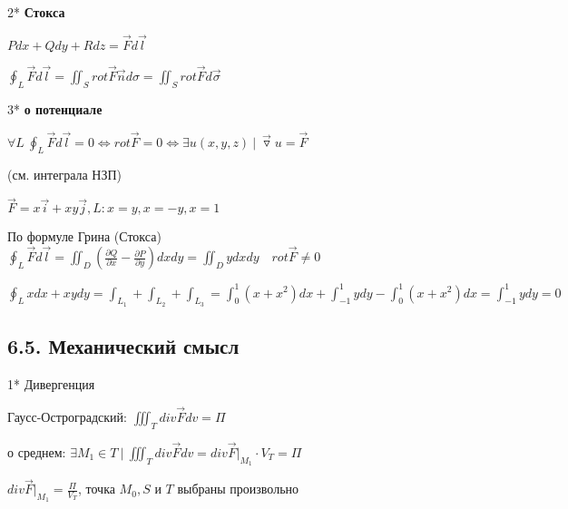 \documentclass[12pt]{article}
\begin{document}

    \mediumvspace

    \hypertarget{theoremStokesinvectorform}{}

    2* \textbf{Стокса}

    $Pdx + Qdy + Rdz = \overrightarrow{F}d\overrightarrow{l}$

    $\oint_L \overrightarrow{F}d\overrightarrow{l} = \iint_S rot \overrightarrow{F} \overrightarrow{n} d\sigma = \iint_S rot \overrightarrow{F} d\overrightarrow{\sigma}$

    \mediumvspace

    \hypertarget{theoremaboutpotentialinvectorform}{}

    3* \textbf{\Ths о потенциале}

    $\forall L \ \oint_L \overrightarrow{F}d\overrightarrow{l} = 0 \Longleftrightarrow rot \overrightarrow{F} = 0 \Longleftrightarrow \exists u(x, y, z) \ | \ \overrightarrow{\triangledown} u = \overrightarrow{F}$

    (см. \Ths интеграла НЗП)

    \Ex $\overrightarrow{F} = x\overrightarrow{i} + xy \overrightarrow{j}, L: x = y, x = -y, x = 1$

    По формуле Грина (Стокса) $\oint_L \overrightarrow{F} d\overrightarrow{l} = \iint_{D} \left(\frac{\partial Q}{\partial x} - \frac{\partial P}{\partial y}\right) dxdy =
    \iint_D y dxdy \quad rot \overrightarrow{F} \neq 0$

    $\oint_L xdx + xydy = \int_{L_1} + \int_{L_2} + \int_{L_3} = \int_0^1 (x + x^2) dx + \int_{-1}^1 y dy - \int_0^1 (x + x^2) dx = \int_{-1}^1 y dy = 0$

    \subsection{6.5. Механический смысл}

    \hypertarget{divergencemechanicalmeaning}{}

    1* Дивергенция

    Гаусс-Остроградский: $\iiint_T div \overrightarrow{F} dv = \Pi$

    \Ths о среднем: $\exists M_1 \in T \ | \ \iiint_T div \overrightarrow{F} dv = div \overrightarrow{F} \Big|_{M_1} \cdot V_T = \Pi$

    $div \overrightarrow{F} \Big|_{M_1} = \frac{\Pi}{V_T}$, точка $M_0, S$ и $T$ выбраны произвольно
\end{document}
